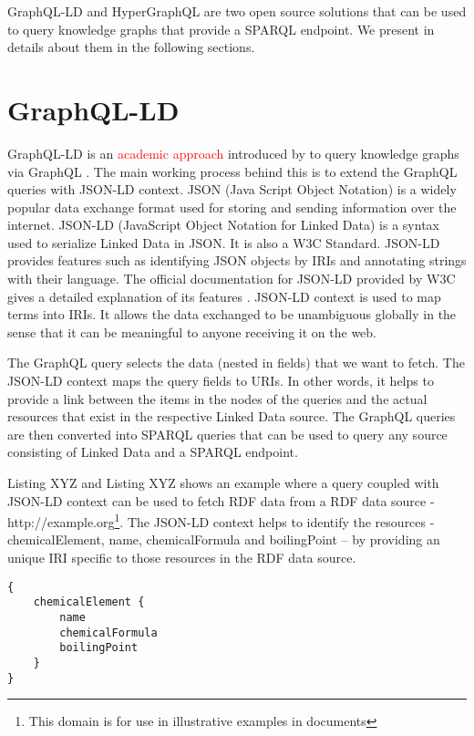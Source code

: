 GraphQL-LD and HyperGraphQL are two open source solutions that can be used to query knowledge graphs that provide a SPARQL endpoint. We present in details about them in the following sections.

\section{GraphQL-LD}

GraphQL-LD is an \textcolor{red}{academic approach} introduced by \citeauthor{Taelman2018} to query knowledge graphs via GraphQL \cite{Taelman2018}. The main working process behind this is to extend the GraphQL queries with JSON-LD context. 
JSON (Java Script Object Notation) is a widely popular data exchange format used for storing and sending information over the internet. JSON-LD (JavaScript Object Notation for Linked Data) is a syntax used to serialize Linked Data in JSON. It is also a W3C Standard. JSON-LD provides features such as identifying JSON objects by IRIs and annotating strings with their language. The official documentation for JSON-LD provided by W3C gives a detailed explanation of its features \cite{Sporny2014}. JSON-LD context is used to map terms into IRIs. It allows the data exchanged to be unambiguous globally in the sense that it can be meaningful to anyone receiving it on the web.   

The GraphQL query selects the data (nested in fields) that we want to fetch. The JSON-LD context maps the query fields to URIs. In other words, it helps to provide a link between the items in the nodes of the queries and the actual resources that exist in the respective Linked Data source. The GraphQL queries are then converted into SPARQL queries that can be used to query any source consisting of Linked Data and a SPARQL endpoint.

Listing XYZ and Listing XYZ shows an example where a query coupled with JSON-LD context can be used to fetch RDF data from a RDF data source - http://example.org\footnote{This domain is for use in illustrative examples in documents}. The JSON-LD context helps to identify the resources - chemicalElement, name, chemicalFormula and boilingPoint – by providing an unique IRI specific to those resources in the RDF data source.

\begin{minipage}{\linewidth}
\begin{lstlisting}[label=listing:listing6, caption={GraphQL query}]
{
	chemicalElement {
		name
		chemicalFormula
		boilingPoint
	}
}
\end{lstlisting}
\end{minipage}

